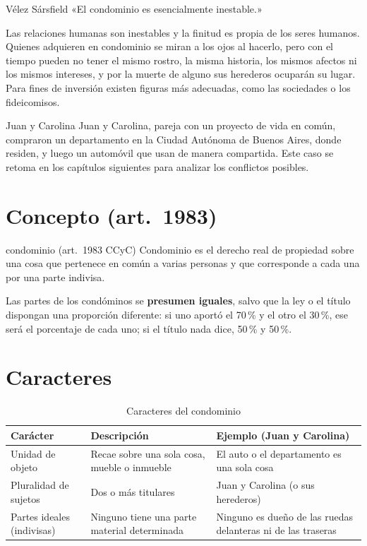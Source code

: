 \documentclass[12pt,oneside]{book}
\begin{document}
\begin{regla}{Vélez Sársfield}
«El condominio es esencialmente inestable.»
\end{regla}

Las relaciones humanas son inestables y la finitud es propia de los seres humanos. Quienes adquieren en condominio se miran a los ojos al hacerlo, pero con el tiempo pueden no tener el mismo rostro, la misma historia, los mismos afectos ni los mismos intereses, y por la muerte de alguno sus herederos ocuparán su lugar. Para fines de inversión existen figuras más adecuadas, como las sociedades o los fideicomisos.

\begin{ejemplo}{Juan y Carolina}
Juan y Carolina, pareja con un proyecto de vida en común, compraron un departamento en la Ciudad Autónoma de Buenos Aires, donde residen, y luego un automóvil que usan de manera compartida. Este caso se retoma en los capítulos siguientes para analizar los conflictos posibles.
\end{ejemplo}

\section{Concepto (art.~1983)}

\begin{definicion}{condominio (art.~1983 CCyC)}
Condominio es el derecho real de propiedad sobre una cosa que pertenece en común a varias personas y que corresponde a cada una por una parte indivisa.
\end{definicion}

Las partes de los condóminos se \textbf{presumen iguales}, salvo que la ley o el título dispongan una proporción diferente: si uno aportó el 70\,\% y el otro el 30\,\%, ese será el porcentaje de cada uno; si el título nada dice, 50\,\% y 50\,\%.

\section{Caracteres}

\begin{table}[H]
\centering
\small
\begin{tabularx}{\textwidth}{>{\raggedright\arraybackslash}p{}>{\raggedright\arraybackslash}X>{\raggedright\arraybackslash}X}
\toprule
\textbf{Carácter} & \textbf{Descripción} & \textbf{Ejemplo (Juan y Carolina)} \\
\midrule
Unidad de objeto & Recae sobre una sola cosa, mueble o inmueble & El auto o el departamento es una sola cosa \\
Pluralidad de sujetos & Dos o más titulares & Juan y Carolina (o sus herederos) \\
Partes ideales (indivisas) & Ninguno tiene una parte material determinada & Ninguno es dueño de las ruedas delanteras ni de las traseras \\
\bottomrule
\end{tabularx}
\caption{Caracteres del condominio}
\end{table}
\end{document}
